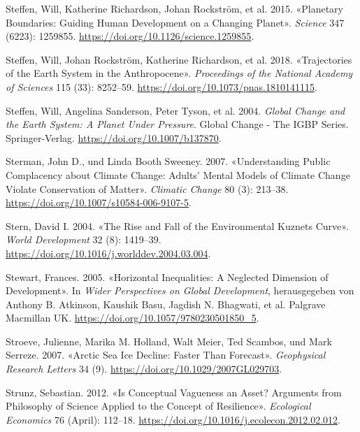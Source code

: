 \documentclass[
  nswissgerman,
  a4paper,
  DIV=11,
  numbers=noendperiod,
  oneside,
  openany]{scrreprt}
\newlength{\cslhangindent}
\newenvironment{CSLReferences}[2] %
 {\begin{list}{}{%
  \setlength{\itemindent}{0pt}
  \setlength{\leftmargin}{0pt}
  \setlength{\parsep}{0pt}
  \ifodd #1
   \setlength{\leftmargin}{\cslhangindent}
   \setlength{\itemindent}{-1\cslhangindent}
  \fi
  \setlength{\itemsep}{#2\baselineskip}}}
 {\end{list}}
\begin{document}
\begin{CSLReferences}{1}{1}
{Steffen, Will, Katherine Richardson, Johan Rockström, et al.} 2015.
{«Planetary Boundaries: {Guiding} Human Development on a Changing
Planet»}. \emph{Science} 347 (6223): 1259855.
\url{https://doi.org/10.1126/science.1259855}.

Steffen, Will, Johan Rockström, Katherine Richardson, et al. 2018.
{«Trajectories of the {Earth System} in the {Anthropocene}»}.
\emph{Proceedings of the National Academy of Sciences} 115 (33):
8252--59. \url{https://doi.org/10.1073/pnas.1810141115}.

Steffen, Will, Angelina Sanderson, Peter Tyson, et al. 2004.
\emph{Global {Change} and the {Earth System}: {A Planet Under
Pressure}}. Global {Change} - {The IGBP Series}. Springer-Verlag.
\url{https://doi.org/10.1007/b137870}.

Sterman, John D., und Linda Booth Sweeney. 2007. {«Understanding Public
Complacency about Climate Change: Adults' Mental Models of Climate
Change Violate Conservation of Matter»}. \emph{Climatic Change} 80 (3):
213--38. \url{https://doi.org/10.1007/s10584-006-9107-5}.

Stern, David I. 2004. {«The {Rise} and {Fall} of the {Environmental
Kuznets Curve}»}. \emph{World Development} 32 (8): 1419--39.
\url{https://doi.org/10.1016/j.worlddev.2004.03.004}.

Stewart, Frances. 2005. {«Horizontal {Inequalities}: {A Neglected
Dimension} of {Development}»}. In \emph{Wider {Perspectives} on {Global
Development}}, herausgegeben von Anthony B. Atkinson, Kaushik Basu,
Jagdish N. Bhagwati, et al. Palgrave Macmillan UK.
\url{https://doi.org/10.1057/9780230501850_5}.

Stroeve, Julienne, Marika M. Holland, Walt Meier, Ted Scambos, und Mark
Serreze. 2007. {«Arctic Sea Ice Decline: {Faster} Than Forecast»}.
\emph{Geophysical Research Letters} 34 (9).
\url{https://doi.org/10.1029/2007GL029703}.

Strunz, Sebastian. 2012. {«Is Conceptual Vagueness an Asset? {Arguments}
from Philosophy of Science Applied to the Concept of Resilience»}.
\emph{Ecological Economics} 76 (April): 112--18.
\url{https://doi.org/10.1016/j.ecolecon.2012.02.012}.


\end{CSLReferences}
\end{document}
